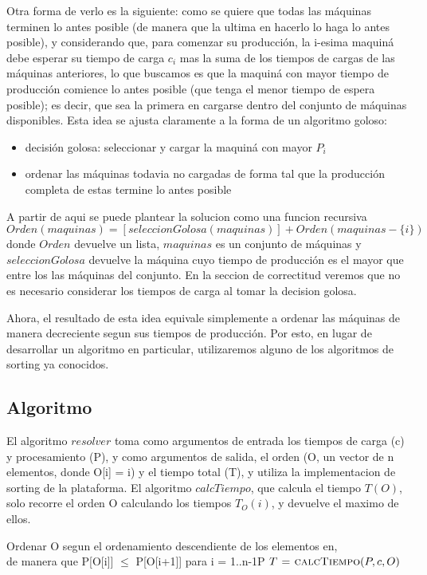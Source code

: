 Otra forma de verlo es la siguiente: como se quiere que todas las m\'aquinas terminen lo antes posible (de manera que la ultima en hacerlo lo haga lo antes posible), y considerando
que, para comenzar su producci\'on, la i-esima maquin\'a debe esperar su tiempo de carga $c_i$ mas la suma de los tiempos de cargas de las m\'aquinas anteriores,
lo que buscamos es que la maquin\'a con mayor tiempo de producci\'on comience lo antes posible (que tenga el menor tiempo de espera posible); es decir, que sea la primera en cargarse dentro del conjunto de m\'aquinas disponibles. Esta idea se ajusta claramente a la forma de un algoritmo goloso:
\begin{itemize}
	\item decisi\'on golosa: seleccionar y cargar la maquin\'a con mayor $P_i$
	\item ordenar las m\'aquinas todavia no cargadas de forma tal que la producci\'on completa de estas termine lo antes posible
\end{itemize}
A partir de aqui se puede plantear la solucion como una funcion recursiva
$$ Orden(maquinas) = [seleccionGolosa(maquinas)] + Orden(maquinas - \{i\})$$
donde $Orden$ devuelve un lista, $maquinas$ es un conjunto de m\'aquinas y $seleccionGolosa$ devuelve la m\'aquina cuyo tiempo de producci\'on es el mayor que entre los  las m\'aquinas del conjunto. En la seccion de correctitud veremos que  no es necesario considerar los tiempos de carga al tomar la decision golosa.

Ahora, el resultado de esta idea equivale simplemente a ordenar las m\'aquinas de manera decreciente segun sus tiempos de producci\'on. Por esto, en lugar de desarrollar un algoritmo en particular, utilizaremos alguno de los algoritmos de sorting ya conocidos.

\subsection{Algoritmo}
 
El algoritmo $resolver$ toma como argumentos de entrada los tiempos de carga (c) y procesamiento (P), y como argumentos de salida,
el orden (O, un vector de n elementos, donde O[i] = i) y el tiempo total (T), y utiliza la implementacion
de sorting de la plataforma. El algoritmo $calcTiempo$, que calcula el tiempo $T(O)$, solo recorre el orden O
calculando los tiempos $T_{O}(i)$, y devuelve el maximo de ellos. 


\begin{algorithm}[H]
\caption{}
\begin{codebox}
\li Ordenar O segun el ordenamiento descendiente de los elementos en, \\
 			de manera que P[O[i]] $\leq$ P[O[i+1]] para i = 1..n-1P
\li $T  \mathrel{\hspace{1pt}=\hspace{1pt}} \textnormal{\scshape calcTiempo}(P, c, O)$
\End
\end{codebox}
\end{algorithm}

